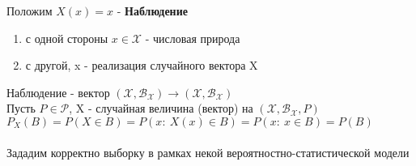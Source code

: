 \documentclass[25pt]{article}
\begin{document}
Положим $X(x) = x$ - \textbf{Наблюдение}
\begin{enumerate}
    \item с одной стороны $x \in \mathcal{X}$ - числовая природа
    \item с другой, x - реализация случайного вектора X
\end{enumerate}
Наблюдение - вектор $(\mathcal{X}, \mathcal{B}_\mathcal{X}) \rightarrow (\mathcal{X}, \mathcal{B}_\mathcal{X})$
\\
Пусть $P \in \mathcal{P}$, X - случайная величина (вектор) на $(\mathcal{X}, \mathcal{B}_\mathcal{X}, P)$
\\ $P_X(B) = P(X \in B) = P(x:\ X(x) \in B) = P(x:\ x \in B) = P(B)$
\\ \\
Зададим корректно выборку в рамках некой вероятностно-статистической модели \\ 
\end{document}
